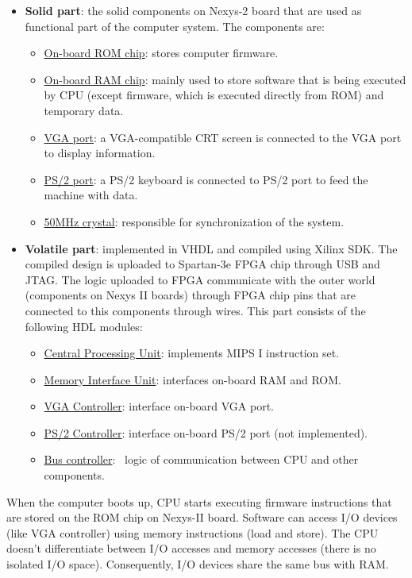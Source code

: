 \documentclass[]{scrartcl}
\begin{document}
\begin{itemize}
\item \textbf{Solid part}: the solid components on Nexys-2 board that are
      used as functional part of the computer system. The components are:
      \begin{itemize}
      \item \underline{On-board ROM chip}: stores computer firmware.
      \item \underline{On-board RAM chip}: mainly used to store software that
            is being executed by CPU (except firmware, which is
            executed directly from ROM) and temporary data.
      \item \underline{VGA port}: a VGA-compatible CRT screen is connected to
            the VGA port to display information.
      \item \underline{PS/2 port}: a PS/2 keyboard is connected to PS/2 port
            to feed the machine with data.
      \item \underline{50MHz crystal}: responsible for synchronization of
            the system.
      \end{itemize}
\item \textbf{Volatile part}: implemented in VHDL and compiled using Xilinx
      SDK. The compiled design is uploaded to Spartan-3e FPGA chip through
      USB and JTAG. The logic uploaded to FPGA communicate with the
      outer world (components on Nexys II boards) through FPGA chip pins
      that are connected to this components through wires. This part
      consists of the following HDL modules:
      \begin{itemize}
      \item \underline{Central Processing Unit}:
            implements MIPS I instruction set.
      \item \underline{Memory Interface Unit}:
            interfaces on-board RAM and ROM.
      \item \underline{VGA Controller}: interface on-board VGA port.
      \item \underline{PS/2 Controller}:
            interface on-board PS/2 port (not implemented).
      \item \underline{Bus controller}:
      \     logic of communication between CPU and other components.
      \end{itemize}
\end{itemize}

When the computer boots up, CPU starts executing firmware instructions
that are stored on the ROM chip on Nexys-II board. Software can access
I/O devices (like VGA controller) using memory instructions (load and
store). The CPU doesn't differentiate between I/O accesses and memory accesses
(there is no isolated I/O space). Consequently, I/O devices share the
same bus with RAM.\\
\end{document}
